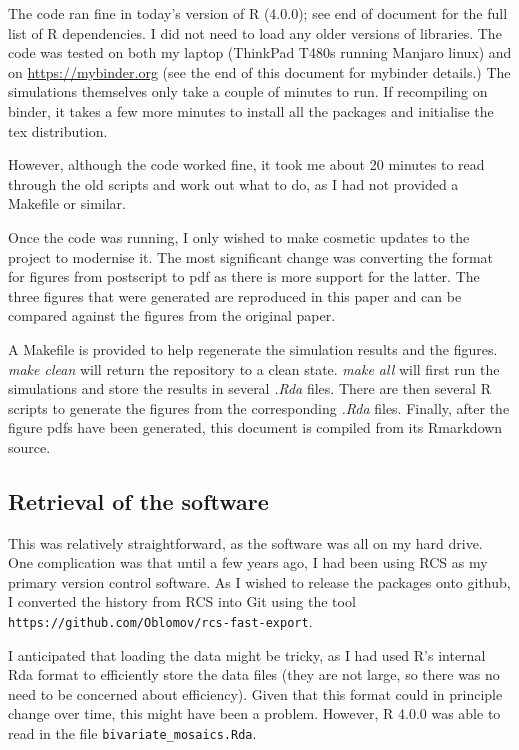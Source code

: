 The code ran fine in today's version of R (4.0.0); see end of document
for the full list of R dependencies. I did not need to load any older
versions of libraries. The code was tested on both my laptop (ThinkPad
T480s running Manjaro linux) and on \url{https://mybinder.org} (see the
end of this document for mybinder details.) The simulations themselves
only take a couple of minutes to run. If recompiling on binder, it takes
a few more minutes to install all the packages and initialise the tex
distribution.

However, although the code worked fine, it took me about 20 minutes to
read through the old scripts and work out what to do, as I had not
provided a Makefile or similar.

Once the code was running, I only wished to make cosmetic updates to the
project to modernise it. The most significant change was converting the
format for figures from postscript to pdf as there is more support for
the latter. The three figures that were generated are reproduced in this
paper and can be compared against the figures from the original paper.

A Makefile is provided to help regenerate the simulation results and the
figures. \emph{make clean} will return the repository to a clean state.
\emph{make all} will first run the simulations and store the results in
several \emph{.Rda} files. There are then several R scripts to generate
the figures from the corresponding \emph{.Rda} files. Finally, after the
figure pdfs have been generated, this document is compiled from its
Rmarkdown source.

\subsection{Retrieval of the software}

This was relatively straightforward, as the software was all on my hard
drive. One complication was that until a few years ago, I had been using
RCS as my primary version control software. As I wished to release the
packages onto github, I converted the history from RCS into Git using
the tool \texttt{https://github.com/Oblomov/rcs-fast-export}.

I anticipated that loading the data might be tricky, as I had used R's
internal Rda format to efficiently store the data files (they are not
large, so there was no need to be concerned about efficiency). Given
that this format could in principle change over time, this might have
been a problem. However, R 4.0.0 was able to read in the file
\texttt{bivariate\_mosaics.Rda}.

